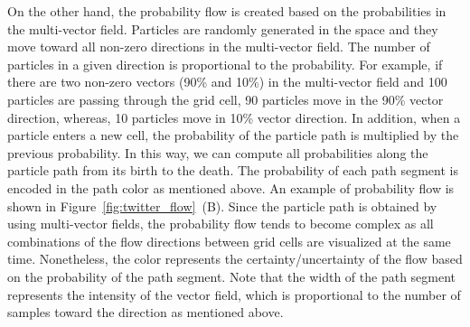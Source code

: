 On the other hand, the probability flow is created based on the probabilities in the multi-vector field. Particles are randomly generated in the space and they move toward all non-zero directions in the multi-vector field. The number of particles in a given direction is proportional to the probability. For example, if there are two non-zero vectors (90\% and 10\%) in the multi-vector field and 100 particles are passing through the grid cell, 90 particles move in the 90\% vector direction, whereas, 10 particles move in 10\% vector direction. In addition, when a particle enters a new cell, the probability of the particle path is multiplied by the previous probability. In this way, we can compute all probabilities along the particle path from its birth to the death. The probability of each path segment is encoded in the path color as mentioned above. An example of probability flow is shown in Figure~\ref{fig:twitter_flow}~(B). Since the particle path is obtained by using multi-vector fields, the probability flow tends to become complex as all combinations of the flow directions between grid cells are visualized at the same time. Nonetheless, the color represents the certainty/uncertainty of the flow based on the probability of the path segment. Note that the width of the path segment represents the intensity of the vector field, which is proportional to the number of samples toward the direction as mentioned above. 



